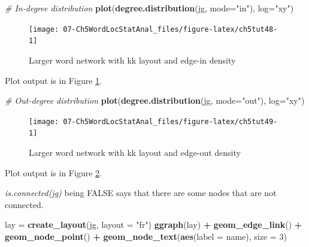 \documentclass[
]{article}
\newenvironment{Shaded}{\begin{snugshade}}{\end{snugshade}}
\newcommand{\AttributeTok}[1]{\textcolor[rgb]{0.13,0.29,0.53}{#1}}
\newcommand{\CommentTok}[1]{\textcolor[rgb]{0.56,0.35,0.01}{\textit{#1}}}
\newcommand{\DecValTok}[1]{\textcolor[rgb]{0.00,0.00,0.81}{#1}}
\newcommand{\FunctionTok}[1]{\textcolor[rgb]{0.13,0.29,0.53}{\textbf{#1}}}
\newcommand{\NormalTok}[1]{#1}
\newcommand{\OtherTok}[1]{\textcolor[rgb]{0.56,0.35,0.01}{#1}}
\newcommand{\SpecialCharTok}[1]{\textcolor[rgb]{0.81,0.36,0.00}{\textbf{#1}}}
\newcommand{\StringTok}[1]{\textcolor[rgb]{0.31,0.60,0.02}{#1}}
\begin{document}
\begin{Shaded}
\begin{Highlighting}[]
\CommentTok{\# In{-}degree distribution}
\FunctionTok{plot}\NormalTok{(}\FunctionTok{degree.distribution}\NormalTok{(jg, }\AttributeTok{mode=}\StringTok{"in"}\NormalTok{), }\AttributeTok{log=}\StringTok{"xy"}\NormalTok{)}
\end{Highlighting}
\end{Shaded}

\begin{figure}

{\centering \texttt{[image: 07-Ch5WordLocStatAnal\_files/figure-latex/ch5tut48-1]} 

}

\caption{Larger word network with kk layout and edge-in density}\label{fig:ch5tut48}
\end{figure}

Plot output is in Figure \ref{fig:ch5tut48}.

\begin{Shaded}
\begin{Highlighting}[]
\CommentTok{\# Out{-}degree distribution}
\FunctionTok{plot}\NormalTok{(}\FunctionTok{degree.distribution}\NormalTok{(jg, }\AttributeTok{mode=}\StringTok{"out"}\NormalTok{), }\AttributeTok{log=}\StringTok{"xy"}\NormalTok{)}
\end{Highlighting}
\end{Shaded}

\begin{figure}

{\centering \texttt{[image: 07-Ch5WordLocStatAnal\_files/figure-latex/ch5tut49-1]} 

}

\caption{Larger word network with kk layout and edge-out density}\label{fig:ch5tut49}
\end{figure}

Plot output is in Figure \ref{fig:ch5tut49}.

\emph{is.connected(jg)} being FALSE says that there are some nodes that are not connected.

\begin{Shaded}
\begin{Highlighting}[]
\NormalTok{lay }\OtherTok{=} \FunctionTok{create\_layout}\NormalTok{(jg, }\AttributeTok{layout =} \StringTok{"fr"}\NormalTok{)}
\FunctionTok{ggraph}\NormalTok{(lay) }\SpecialCharTok{+} 
   \FunctionTok{geom\_edge\_link}\NormalTok{() }\SpecialCharTok{+} 
   \FunctionTok{geom\_node\_point}\NormalTok{() }\SpecialCharTok{+}
   \FunctionTok{geom\_node\_text}\NormalTok{(}\FunctionTok{aes}\NormalTok{(}\AttributeTok{label =}\NormalTok{ name), }\AttributeTok{size =} \DecValTok{3}\NormalTok{)}
\end{Highlighting}
\end{Shaded}
\end{document}
